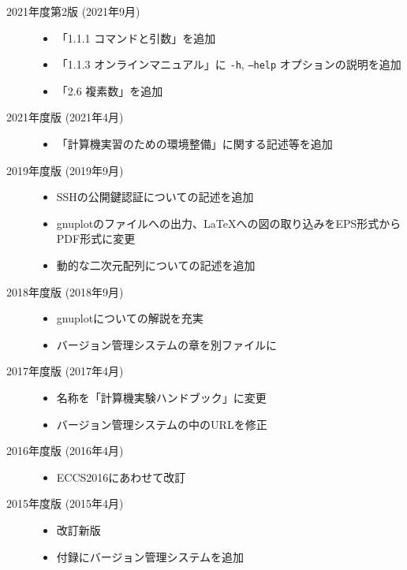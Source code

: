 \begin{description}
    \item[2021年度第2版 (2021年9月)] \mbox{}

          \begin{itemize}
              \item 「1.1.1 コマンドと引数」を追加
              \item 「1.1.3 オンラインマニュアル」に \texttt{-h}, \texttt{--help} オプションの説明を追加
              \item 「2.6 複素数」を追加
          \end{itemize}

    \item[2021年度版 (2021年4月)] \mbox{}

          \begin{itemize}
              \item 「計算機実習のための環境整備」に関する記述等を追加
          \end{itemize}

    \item[2019年度版 (2019年9月)] \mbox{}

          \begin{itemize}
              \item SSHの公開鍵認証についての記述を追加
              \item gnuplotのファイルへの出力、\LaTeX への図の取り込みをEPS形式からPDF形式に変更
              \item 動的な二次元配列についての記述を追加
          \end{itemize}

    \item[2018年度版 (2018年9月)] \mbox{}

          \begin{itemize}
              \item gnuplotについての解説を充実
              \item バージョン管理システムの章を別ファイルに
          \end{itemize}

    \item[2017年度版 (2017年4月)] \mbox{}

          \begin{itemize}
              \item 名称を「計算機実験ハンドブック」に変更
              \item バージョン管理システムの中のURLを修正
          \end{itemize}

    \item[2016年度版 (2016年4月)] \mbox{}

          \begin{itemize}
              \item ECCS2016にあわせて改訂
          \end{itemize}

    \item[2015年度版 (2015年4月)] \mbox{}

          \begin{itemize}
              \item 改訂新版
              \item 付録にバージョン管理システムを追加
          \end{itemize}

\end{description}
